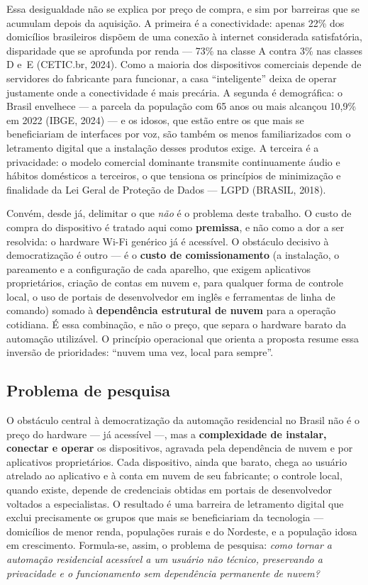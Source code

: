 Essa desigualdade não se explica por preço de compra, e sim por barreiras que se
acumulam depois da aquisição. A primeira é a conectividade: apenas 22\% dos
domicílios brasileiros dispõem de uma conexão à internet considerada satisfatória,
disparidade que se aprofunda por renda --- 73\% na classe A contra 3\% nas classes
D e~E (CETIC.br, 2024). Como a maioria dos dispositivos comerciais depende de
servidores do fabricante para funcionar, a casa ``inteligente'' deixa de operar
justamente onde a conectividade é mais precária. A segunda é demográfica: o Brasil
envelhece --- a parcela da população com 65 anos ou mais alcançou 10,9\% em 2022
(IBGE, 2024) --- e os idosos, que estão entre os que mais se beneficiariam de
interfaces por voz, são também os menos familiarizados com o letramento digital que a
instalação desses produtos exige. A terceira é a privacidade: o modelo comercial
dominante transmite continuamente áudio e hábitos domésticos a terceiros, o que
tensiona os princípios de minimização e finalidade da Lei Geral de Proteção de Dados
--- LGPD (BRASIL, 2018).

Convém, desde já, delimitar o que \textit{não} é o problema deste trabalho. O custo de
compra do dispositivo é tratado aqui como \textbf{premissa}, e não como a dor a ser
resolvida: o hardware Wi-Fi genérico já é acessível. O obstáculo decisivo à
democratização é outro --- é o \textbf{custo de comissionamento} (a instalação, o
pareamento e a configuração de cada aparelho, que exigem aplicativos proprietários,
criação de contas em nuvem e, para qualquer forma de controle local, o uso de portais
de desenvolvedor em inglês e ferramentas de linha de comando) somado à
\textbf{dependência estrutural de nuvem} para a operação cotidiana. É essa combinação,
e não o preço, que separa o hardware barato da automação utilizável. O princípio
operacional que orienta a proposta resume essa inversão de prioridades: ``nuvem uma
vez, local para sempre''.

\subsection{Problema de pesquisa}

O obstáculo central à democratização da automação residencial no Brasil não é o preço
do hardware --- já acessível ---, mas a \textbf{complexidade de instalar, conectar e
operar} os dispositivos, agravada pela dependência de nuvem e por aplicativos
proprietários. Cada dispositivo, ainda que barato, chega ao usuário atrelado ao
aplicativo e à conta em nuvem de seu fabricante; o controle local, quando existe,
depende de credenciais obtidas em portais de desenvolvedor voltados a especialistas.
O resultado é uma barreira de letramento digital que exclui precisamente os grupos que
mais se beneficiariam da tecnologia --- domicílios de menor renda, populações rurais e
do Nordeste, e a população idosa em crescimento. Formula-se, assim, o problema de
pesquisa: \textit{como tornar a automação residencial acessível a um usuário não
técnico, preservando a privacidade e o funcionamento sem dependência permanente de
nuvem?}

